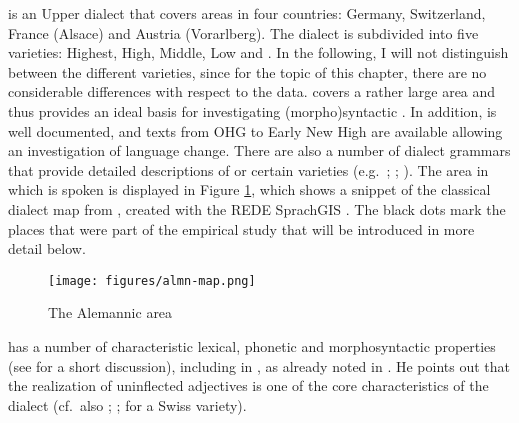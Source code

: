 \documentclass[output=paper,colorlinks,citecolor=brown]{langscibook}
\begin{document}
 is an Upper  dialect that covers areas in four countries: Germany, Switzerland, France (Alsace) and Austria (Vorarlberg). The dialect is subdivided into five  varieties: Highest, High, Middle, Low  and . In the following, I will not distinguish between the different  varieties, since for the topic of this chapter, there are no considerable differences with respect to the data.  covers a rather large area and thus provides an ideal basis for investigating (morpho)syntactic . In addition,  is well documented, and  texts from OHG to Early New High  are available allowing an investigation of language change. There are also a number of dialect grammars that provide detailed descriptions of  or certain  varieties (e.g.~\citealp{birlinger1868alemannische}; \citealp{Fischer1960}; \citealp{Staedele1927}).
The area in which  is spoken is displayed in Figure \ref{fig:map-almn}, which shows a snippet of the classical dialect map from \citet{Wiesinger1983}, created with the REDE SprachGIS \citep{bock2008teil}. The black dots mark the places that were part of the empirical study that will be introduced in more detail below.

\begin{figure}[h!]
     \texttt{[image: figures/almn-map.png]}
    \caption{The Alemannic area}
    \label{fig:map-almn}
\end{figure}

 has a number of characteristic lexical, phonetic and morphosyntactic properties (see \citealp{Rehn2021} for a short discussion), including  in , as already noted in \citet[158]{birlinger1868alemannische}. He points out that the realization of uninflected  adjectives is one of the core characteristics of the  dialect 
(cf.~also \citealp{Staedele1927}; \citealp{Rehn2019}; \citealp{leu2015architecture} for a Swiss  variety).
\end{document}
